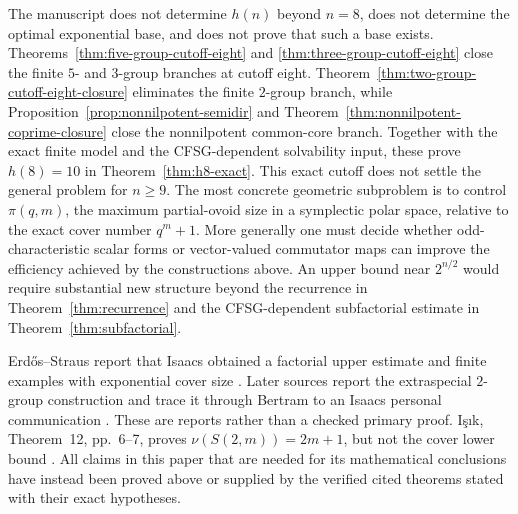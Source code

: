 \documentclass[11pt]{article}
\theoremstyle{remark}
\newcommand{\nuG}{\nu}
\begin{document}
The manuscript does not determine $h(n)$ beyond $n=8$, does not determine
the optimal exponential base, and does not prove that such a base exists.
Theorems~\ref{thm:five-group-cutoff-eight} and
\ref{thm:three-group-cutoff-eight} close the finite $5$- and $3$-group
branches at cutoff eight.  Theorem~\ref{thm:two-group-cutoff-eight-closure}
eliminates the finite $2$-group branch, while
Proposition~\ref{prop:nonnilpotent-semidir} and
Theorem~\ref{thm:nonnilpotent-coprime-closure} close the nonnilpotent
common-core branch.  Together with the exact finite model and the
CFSG-dependent solvability input, these prove $h(8)=10$ in
Theorem~\ref{thm:h8-exact}.  This exact cutoff does not settle the general
problem for $n\ge9$.
The most concrete geometric subproblem is to control $\pi(q,m)$, the maximum
partial-ovoid size in a symplectic polar space, relative to the exact cover
number $q^m+1$.  More generally one must decide whether odd-characteristic
scalar forms or vector-valued commutator maps can improve the efficiency achieved by the
constructions above. An
upper bound near $2^{n/2}$ would require substantial new structure beyond
the recurrence in Theorem~\ref{thm:recurrence} and the CFSG-dependent
subfactorial estimate in Theorem~\ref{thm:subfactorial}.

Erd\H{o}s--Straus report that Isaacs obtained a factorial upper estimate and
finite examples with exponential cover size
\cite[p.~311]{erdos_straus_1976}. Later sources report the extraspecial
$2$-group construction and trace it through Bertram to an Isaacs personal
communication \cite[Example~4.5, p.~488]
{abdollahi_akbari_maimani_2006}\cite[ref.~6]{bertram_1983}. These are reports
rather than a checked primary proof. I\c{s}{\i}k, Theorem~12, pp.~6--7,
proves $\nuG(S(2,m))=2m+1$, but not the cover lower bound
\cite{isik_2005}. All claims in this paper that are needed for its
mathematical conclusions have instead been proved above or supplied by the
verified cited theorems stated with their exact hypotheses.





\end{document}
